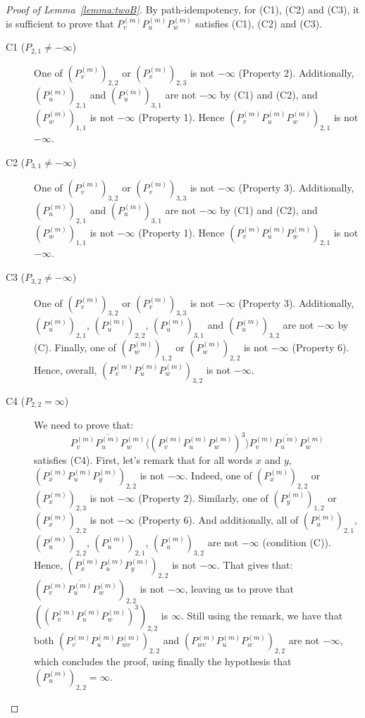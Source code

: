 \documentclass[10pt,a4paper]{amsart}
\theoremstyle{definition}
\numberwithin{equation}{section}
\theoremstyle{remark}
\theoremstyle{remark}
\begin{document}
\begin{proof}[Proof of Lemma~\ref{lemma:twoB}]
By path-idempotency, for (C1), (C2) and (C3), it is sufficient to prove that $P^{(m)}_v P^{(m)}_u P^{(m)}_w$ satisfies (C1), (C2) and (C3).

\begin{description}
    \item[C1 ($P_{2,1} \neq -\infty$)] One of $(P^{(m)}_v)_{2,2}$ or $(P^{(m)}_v)_{2,3}$ is not $-\infty$ (Property 2). Additionally, $(P^{(m)}_u)_{2,1}$ and $(P^{(m)}_u)_{3,1}$ are not $-\infty$ by (C1) and (C2), and $(P^{(m)}_w)_{1,1}$ is not $-\infty$ (Property 1). Hence $(P^{(m)}_v P^{(m)}_u P^{(m)}_w)_{2,1}$ is not $-\infty$.

\item[C2 ($P_{3,1} \neq -\infty$)]One of $(P^{(m)}_v)_{3,2}$ or $(P^{(m)}_v)_{3,3}$ is not $-\infty$ (Property 3). Additionally, $(P^{(m)}_u)_{2,1}$ and $(P^{(m)}_u)_{3,1}$ are not $-\infty$ by (C1) and (C2), and $(P^{(m)}_w)_{1,1}$ is not $-\infty$ (Property 1). Hence $(P^{(m)}_v P^{(m)}_u P^{(m)}_w)_{2,1}$ is not $-\infty$.

\item[C3 ($P_{3,2} \neq -\infty$)]One of $(P^{(m)}_v)_{3,2}$ or $(P^{(m)}_v)_{3,3}$ is not $-\infty$ (Property 3). Additionally, $(P^{(m)}_u)_{2,1}$, $(P^{(m)}_u)_{2,2}$, $(P^{(m)}_u)_{3,1}$ and $(P^{(m)}_u)_{3,2}$ are not $-\infty$ by (C). Finally, one of $(P^{(m)}_{w})_{1,2}$ or $(P^{(m)}_{w})_{2,2}$ is not $-\infty$ (Property 6). Hence, overall, $(P^{(m)}_v P^{(m)}_u P^{(m)}_w)_{3,2}$ is not $-\infty$.

\item[C4 ($P_{2,2} = \infty$)] We need to prove that:
$$\overline{P^{(m)}_v P^{(m)}_u P^{(m)}_w} \langle (P^{(m)}_v P^{(m)}_u P^{(m)}_w)^3 \rangle \overline{P^{(m)}_v P^{(m)}_u P^{(m)}_w}$$
satisfies (C4).
First, let's remark that for all words $x$ and $y$, $(P^{(m)}_x P^{(m)}_u P^{(m)}_y)_{2,2}$ is not $-\infty$. Indeed, one of $(P^{(m)}_x)_{2,2}$ or $(P^{(m)}_x)_{2,3}$ is not $-\infty$ (Property 2). Similarly, one of $(P^{(m)}_y)_{1,2}$ or $(P^{(m)}_x)_{2,2}$ is not $-\infty$ (Property 6). And additionally, all of $(P^{(m)}_u)_{2,1}$, $(P^{(m)}_u)_{2,2}$,  $(P^{(m)}_u)_{2,1}$,  $(P^{(m)}_u)_{3,2}$ are not $-\infty$ (condition (C)). Hence, $(P^{(m)}_x P^{(m)}_u P^{(m)}_y)_{2,2}$ is not $-\infty$.
That gives that: $(\overline{P^{(m)}_v P^{(m)}_u P^{(m)}_w})_{2,2}$ is not $-\infty$, leaving us to prove that $((P^{(m)}_v P^{(m)}_u P^{(m)}_w)^3)_{2,2}$ is $\infty$. Still using the remark, we have that both $(P^{(m)}_v P^{(m)}_u P^{(m)}_{wv})_{2,2}$ and $(P^{(m)}_{wv} P^{(m)}_u P^{(m)}_w)_{2,2}$ are not $-\infty$, which concludes the proof, using finally the hypothesis that $(P^{(m)}_u)_{2,2} = \infty$. \qedhere
\end{description}
\end{proof}
\end{document}
